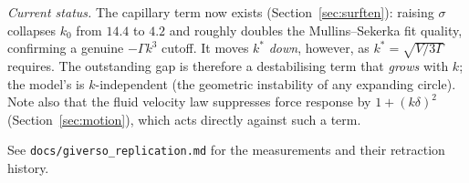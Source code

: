 \documentclass[11pt]{article}
\begin{document}
\emph{Current status.} The capillary term now exists
(Section~\ref{sec:surften}): raising $\sigma$ collapses $k_0$ from $14.4$ to
$4.2$ and roughly doubles the Mullins--Sekerka fit quality, confirming a genuine
$-\Gamma k^3$ cutoff. It moves $k^\ast$ \emph{down}, however, as
$k^\ast=\sqrt{V/3\Gamma}$ requires. The outstanding gap is therefore a
destabilising term that \emph{grows} with $k$; the model's is $k$-independent
(the geometric instability of any expanding circle). Note also that the fluid
velocity law suppresses force response by $1+(k\delta)^2$
(Section~\ref{sec:motion}), which acts directly against such a term.

See \texttt{docs/giverso\_replication.md} for the measurements and their
retraction history.
\end{document}
